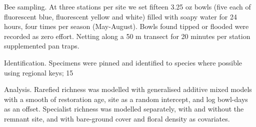 \documentclass{article}
\begin{document}
Bee sampling. At three stations per site we set fifteen 3.25 oz bowls (five each of fluorescent blue, fluorescent yellow and white) filled with soapy water for 24 hours, four times per season (May-August). Bowls found tipped or flooded were recorded as zero effort. Netting along a 50 m transect for 20 minutes per station supplemented pan traps.

Identification. Specimens were pinned and identified to species where possible using regional keys; 15%

Analysis. Rarefied richness was modelled with generalised additive mixed models with a smooth of restoration age, site as a random intercept, and log bowl-days as an offset. Specialist richness was modelled separately, with and without the remnant site, and with bare-ground cover and floral density as covariates.


\end{document}
